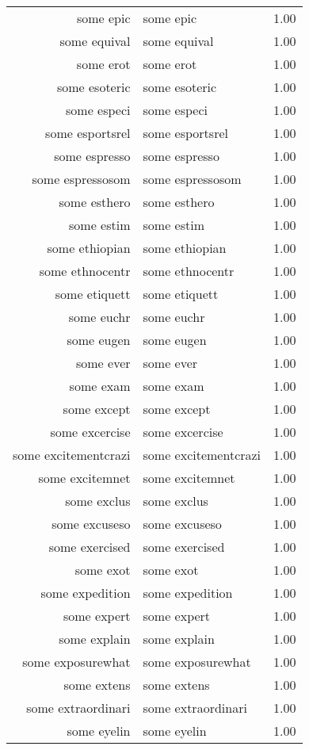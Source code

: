 \begin{table}[ht]
\begin{tabular}{rlr}
  some epic & some epic & 1.00 \\ 
  some equival & some equival & 1.00 \\ 
  some erot & some erot & 1.00 \\ 
  some esoteric & some esoteric & 1.00 \\ 
  some especi & some especi & 1.00 \\ 
  some esportsrel & some esportsrel & 1.00 \\ 
  some espresso & some espresso & 1.00 \\ 
  some espressosom & some espressosom & 1.00 \\ 
  some esthero & some esthero & 1.00 \\ 
  some estim & some estim & 1.00 \\ 
  some ethiopian & some ethiopian & 1.00 \\ 
  some ethnocentr & some ethnocentr & 1.00 \\ 
  some etiquett & some etiquett & 1.00 \\ 
  some euchr & some euchr & 1.00 \\ 
  some eugen & some eugen & 1.00 \\ 
  some ever & some ever & 1.00 \\ 
  some exam & some exam & 1.00 \\ 
  some except & some except & 1.00 \\ 
  some excercise & some excercise & 1.00 \\ 
  some excitementcrazi & some excitementcrazi & 1.00 \\ 
  some excitemnet & some excitemnet & 1.00 \\ 
  some exclus & some exclus & 1.00 \\ 
  some excuseso & some excuseso & 1.00 \\ 
  some exercised & some exercised & 1.00 \\ 
  some exot & some exot & 1.00 \\ 
  some expedition & some expedition & 1.00 \\ 
  some expert & some expert & 1.00 \\ 
  some explain & some explain & 1.00 \\ 
  some exposurewhat & some exposurewhat & 1.00 \\ 
  some extens & some extens & 1.00 \\ 
  some extraordinari & some extraordinari & 1.00 \\ 
  some eyelin & some eyelin & 1.00 \\ 

\end{tabular}
\end{table}
